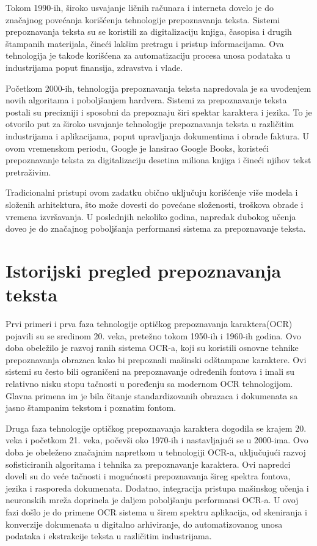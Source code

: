 \documentclass[a4paper,12pt]{article}
\begin{document}
	Tokom 1990-ih, široko usvajanje ličnih računara i interneta dovelo je do značajnog povećanja korišćenja tehnologije prepoznavanja teksta. Sistemi prepoznavanja teksta su se koristili za digitalizaciju knjiga, časopisa i drugih štampanih materijala, čineći lakšim pretragu i pristup informacijama. Ova tehnologija je takođe korišćena za automatizaciju procesa unosa podataka u industrijama poput finansija, zdravstva i vlade.
	
	Početkom 2000-ih, tehnologija prepoznavanja teksta napredovala je sa uvođenjem novih algoritama i poboljšanjem hardvera. Sistemi za prepoznavanje teksta postali su precizniji i sposobni da prepoznaju širi spektar karaktera i jezika. To je otvorilo put za široko usvajanje tehnologije prepoznavanja teksta u različitim industrijama i aplikacijama, poput upravljanja dokumentima i obrade faktura. U ovom vremenskom periodu, Google je lansirao Google Books, koristeći prepoznavanje teksta za digitalizaciju desetina miliona knjiga i čineći njihov tekst pretraživim.
	\newline
	
	Tradicionalni pristupi ovom zadatku obično uključuju korišćenje više modela i složenih arhitektura, što može dovesti do povećane složenosti, troškova obrade i vremena izvršavanja. U poslednjih nekoliko godina, napredak dubokog učenja doveo je do značajnog poboljšanja performansi sistema za prepoznavanje teksta.
	\newpage
	
	\section{Istorijski pregled prepoznavanja teksta}
	
	Prvi primeri i prva faza tehnologije optičkog prepoznavanja karaktera(OCR) pojavili su se sredinom 20. veka, pretežno tokom 1950-ih i 1960-ih godina. Ovo doba obeležilo je razvoj ranih sistema OCR-a, koji su koristili osnovne tehnike prepoznavanja obrazaca kako bi prepoznali mašinski odštampane karaktere. Ovi sistemi su često bili ograničeni na prepoznavanje određenih fontova i imali su relativno nisku stopu tačnosti u poređenju sa modernom OCR tehnologijom. Glavna primena im je bila čitanje standardizovanih obrazaca i dokumenata sa jasno štampanim tekstom i poznatim fontom.
	
	Druga faza tehnologije optičkog prepoznavanja karaktera dogodila se krajem 20. veka i početkom 21. veka, počevši oko 1970-ih i nastavljajući se u 2000-ima. Ovo doba je obeleženo značajnim napretkom u tehnologiji OCR-a, uključujući razvoj sofisticiranih algoritama i tehnika za prepoznavanje karaktera. Ovi napredci doveli su do veće tačnosti i mogućnosti prepoznavanja šireg spektra fontova, jezika i rasporeda dokumenata. Dodatno, integracija pristupa mašinskog učenja i neuronskih mreža doprinela je daljem poboljšanju performansi OCR-a. U ovoj fazi došlo je do primene OCR sistema u širem spektru aplikacija, od skeniranja i konverzije dokumenata u digitalno arhiviranje, do automatizovanog unosa podataka i ekstrakcije teksta u različitim industrijama.
	
\end{document}
